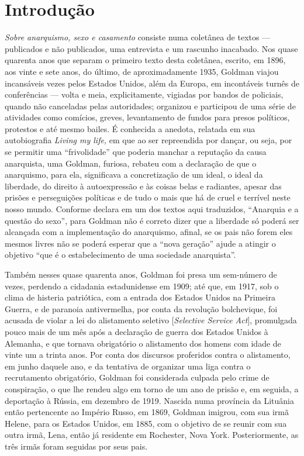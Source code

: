\chapter{Introdução}

\emph{Sobre anarquismo, sexo e casamento} consiste numa coletânea de
textos --- publicados e não publicados, uma entrevista e um rascunho
inacabado. Nos quase quarenta anos que separam o primeiro texto desta
coletânea, escrito, em 1896, aos vinte e sete anos, do último, de
aproximadamente 1935, Goldman viajou incansáveis vezes pelos Estados
Unidos, além da Europa, em incontáveis turnês de conferências --- volta e
meia, explicitamente, vigiadas por bandos de policiais, quando não
canceladas pelas autoridades; organizou e participou de uma série de
atividades como comícios, greves, levantamento de fundos para presos
políticos, protestos e até mesmo bailes. É conhecida a anedota, relatada
em sua autobiografia \emph{Living my life,} em que ao ser repreendida
por dançar, ou seja, por se permitir uma ``frivolidade'' que poderia
manchar a reputação da causa anarquista, uma Goldman, furiosa, rebateu
com a declaração de que o anarquismo, para ela, significava a
concretização de um ideal, o ideal da liberdade, do direito à
autoexpressão e às coisas belas e radiantes, apesar das prisões e
perseguições políticas e de tudo o mais que há de cruel e terrível neste
nosso mundo. Conforme declara em um dos textos aqui traduzidos,
``Anarquia e a questão do sexo'', para Goldman não é correto dizer que a
liberdade só poderá ser alcançada com a implementação do anarquismo,
afinal, se os pais não forem eles mesmos livres não se poderá esperar
que a ``nova geração'' ajude a atingir o objetivo ``que é o
estabelecimento de uma sociedade anarquista''.

Também nesses quase quarenta anos, Goldman foi presa um sem-número de
vezes, perdendo a cidadania estadunidense em 1909; até que, em 1917, sob
o clima de histeria patriótica, com a entrada dos Estados Unidos na
Primeira Guerra, e de paranoia antivermelha, por conta da revolução
bolchevique, foi acusada de violar a lei do alistamento seletivo
{[}\emph{Selective Service Act}{]}, promulgada pouco mais de um mês após
a declaração de guerra dos Estados Unidos à Alemanha, e que tornava
obrigatório o alistamento dos homens com idade de vinte um a trinta
anos. Por conta dos discursos proferidos contra o alistamento, em junho
daquele ano, e da tentativa de organizar uma liga contra o recrutamento
obrigatório, Goldman foi considerada culpada pelo crime de conspiração,
o que lhe rendeu algo em torno de um ano de prisão e, em seguida, a
deportação à Rússia, em dezembro de 1919. Nascida numa província da
Lituânia então pertencente ao Império Russo, em 1869, Goldman imigrou,
com sua irmã Helene, para os Estados Unidos, em 1885, com o objetivo de
se reunir com sua outra irmã, Lena, então já residente em Rochester,
Nova York. Posteriormente, as três irmãs foram seguidas por seus pais.

